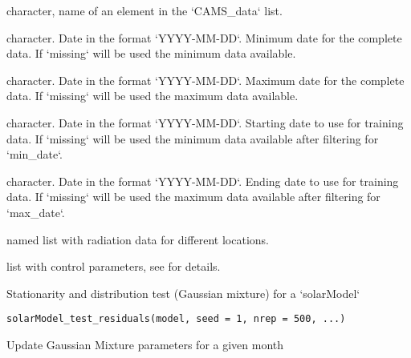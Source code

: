 \documentclass[a4paper]{book}
\begin{document}
\begin{Arguments}
\begin{ldescription}
\item[\code{place}] character, name of an element in the `CAMS\_data` list.

\item[\code{min\_date}] character. Date in the format `YYYY-MM-DD`. Minimum date for the complete data. If `missing` will be used the minimum data available.

\item[\code{max\_date}] character. Date in the format `YYYY-MM-DD`. Maximum date for the complete data. If `missing` will be used the maximum data available.

\item[\code{from}] character. Date in the format `YYYY-MM-DD`. Starting date to use for training data.
If `missing` will be used the minimum data available after filtering for `min\_date`.

\item[\code{to}] character. Date in the format `YYYY-MM-DD`. Ending date to use for training data.
If `missing` will be used the maximum data available after filtering for `max\_date`.

\item[\code{CAMS\_data}] named list with radiation data for different locations.

\item[\code{control\_model}] list with control parameters, see  for details.
\end{ldescription}
\end{Arguments}
%
\begin{Description}\relax
Stationarity and distribution test (Gaussian mixture) for a `solarModel`
\end{Description}
%
\begin{Usage}
\begin{verbatim}
solarModel_test_residuals(model, seed = 1, nrep = 500, ...)
\end{verbatim}
\end{Usage}
%
\begin{Description}\relax
Update Gaussian Mixture parameters for a given month
\end{Description}
\end{document}
